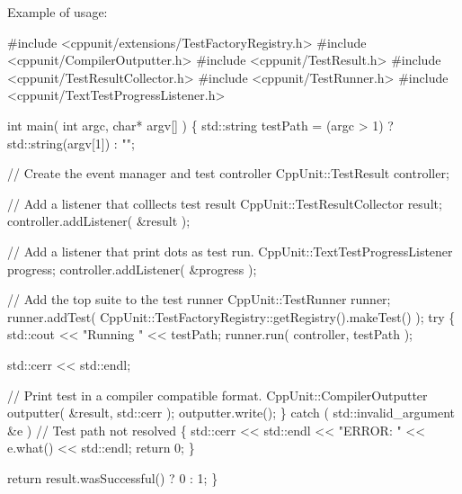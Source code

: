 Example of usage\+: 
\begin{DoxyCode}
\textcolor{preprocessor}{#include <cppunit/extensions/TestFactoryRegistry.h>}
\textcolor{preprocessor}{#include <cppunit/CompilerOutputter.h>}
\textcolor{preprocessor}{#include <cppunit/TestResult.h>}
\textcolor{preprocessor}{#include <cppunit/TestResultCollector.h>}
\textcolor{preprocessor}{#include <cppunit/TestRunner.h>}
\textcolor{preprocessor}{#include <cppunit/TextTestProgressListener.h>}


\textcolor{keywordtype}{int} 
main( \textcolor{keywordtype}{int} argc, \textcolor{keywordtype}{char}* argv[] )
\{
  std::string testPath = (argc > 1) ? std::string(argv[1]) : \textcolor{stringliteral}{""};

  \textcolor{comment}{// Create the event manager and test controller}
  CppUnit::TestResult controller;

  \textcolor{comment}{// Add a listener that colllects test result}
  CppUnit::TestResultCollector result;
  controller.addListener( &result );        

  \textcolor{comment}{// Add a listener that print dots as test run.}
  CppUnit::TextTestProgressListener progress;
  controller.addListener( &progress );      

  \textcolor{comment}{// Add the top suite to the test runner}
  CppUnit::TestRunner runner;
  runner.addTest( CppUnit::TestFactoryRegistry::getRegistry().makeTest() );   
  \textcolor{keywordflow}{try}
  \{
    std::cout << \textcolor{stringliteral}{"Running "}  <<  testPath;
    runner.run( controller, testPath );

    std::cerr << std::endl;

    \textcolor{comment}{// Print test in a compiler compatible format.}
    CppUnit::CompilerOutputter outputter( &result, std::cerr );
    outputter.write();                      
  \}
  \textcolor{keywordflow}{catch} ( std::invalid\_argument &e )  \textcolor{comment}{// Test path not resolved}
  \{
    std::cerr  <<  std::endl  
               <<  \textcolor{stringliteral}{"ERROR: "}  <<  e.what()
               << std::endl;
    \textcolor{keywordflow}{return} 0;
  \}

  \textcolor{keywordflow}{return} result.wasSuccessful() ? 0 : 1;
\}
\end{DoxyCode}
 

